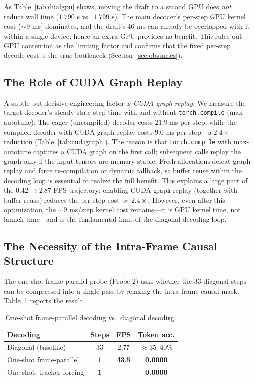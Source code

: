 \documentclass[10pt, twocolumn]{article}
\begin{document}
As Table~\ref{tab:dualgpu} shows, moving the draft to a second GPU does \emph{not} reduce wall time ($1.790$ s vs.\ $1.799$ s). The main decoder's per-step GPU kernel cost ($\sim$9 ms) dominates, and the draft's $46$ ms can already be overlapped with it within a single device; hence an extra GPU provides no benefit. This rules out GPU contention as the limiting factor and confirms that the fixed per-step decode cost is the true bottleneck (Section~\ref{sec:obstacles}).

\subsection{The Role of CUDA Graph Replay}
\label{sec:cudagraph}

A subtle but decisive engineering factor is \emph{CUDA graph replay}. We measure the target decoder's steady-state step time with and without \texttt{torch.compile} (max-autotune). The eager (uncompiled) decoder costs $21.9$ ms per step, while the compiled decoder with CUDA graph replay costs $9.0$ ms per step---a $2.4\times$ reduction (Table~\ref{tab:cudagraph}). The reason is that \texttt{torch.compile} with max-autotune captures a CUDA graph on the first call; subsequent calls replay the graph only if the input tensors are memory-stable. Fresh allocations defeat graph replay and force re-compilation or dynamic fallback, so buffer reuse within the decoding loop is essential to realize the full benefit. This explains a large part of the $0.42 \to 2.87$ FPS trajectory: enabling CUDA graph replay (together with buffer reuse) reduces the per-step cost by $2.4\times$. However, even after this optimization, the $\sim$9 ms/step kernel cost remains---it is GPU kernel time, not launch time---and is the fundamental limit of the diagonal-decoding loop.

\subsection{The Necessity of the Intra-Frame Causal Structure}
\label{sec:oneshot}

The one-shot frame-parallel probe (Probe 2) asks whether the 33 diagonal steps can be compressed into a single pass by relaxing the intra-frame causal mask. Table~\ref{tab:oneshot} reports the result.

\begin{table}[!ht]
  \centering
  \small
  \caption{One-shot frame-parallel decoding vs.\ diagonal decoding.}
  \label{tab:oneshot}
  \setlength{\tabcolsep}{3pt}
  \begin{tabular}{lccc}
    \toprule
    Decoding & Steps & FPS & Token acc. \\
    \midrule
    Diagonal (baseline) & 33 & 2.77 & $\approx$35--40\% \\
    One-shot frame-parallel & \textbf{1} & \textbf{43.5} & \textbf{0.0000} \\
    One-shot, teacher forcing & \textbf{1} & --- & \textbf{0.0000} \\
    \bottomrule
  \end{tabular}
\end{table}
\end{document}
